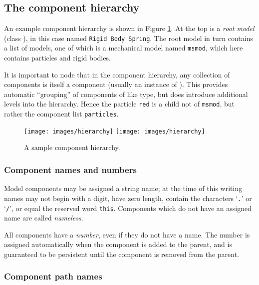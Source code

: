 \documentclass{article}
\begin{document}
\subsection{The component hierarchy}
\label{hierarchySec}

An example component hierarchy is shown in Figure
\ref{hierarchyFig}. At the top is a {\it root model} (class
), 
in this case named {\tt Rigid Body Spring}.  The
root model in turn contains a list of models, one of which is a
mechanical model named {\tt msmod}, which here contains particles and
rigid bodies.

It is important to node that in the component hierarchy, any collection
of components is itself a component (usually an instance of
). 
This provides automatic ``grouping'' of
components of like type, but does introduce additional levels into the
hierarchy. Hence the particle {\tt red} is a child not of {\tt msmod},
but rather the component list {\tt particles}.

\begin{figure}
\begin{center}
\iflatexml
\texttt{[image: images/hierarchy]}
\else
\texttt{[image: images/hierarchy]}
\fi
\end{center}
\caption{A sample component hierarchy.}%
\label{hierarchyFig}
\end{figure}

\subsubsection{Component names and numbers}

Model components may be assigned a string name; at the time of
this writing names may not begin with a digit, have zero length, contain
the characters `{\tt .}' or `{\tt /}', or equal the reserved word {\tt this}.
Components which do not have an assigned name are
called {\it nameless}.

All components have a {\it number}, even if they do not have a name. The
number is assigned automatically when the component is added to the
parent, and is guaranteed to be persistent until the component is
removed from the parent.

\subsubsection{Component path names}
\label{pathNamesSec}
\end{document}
